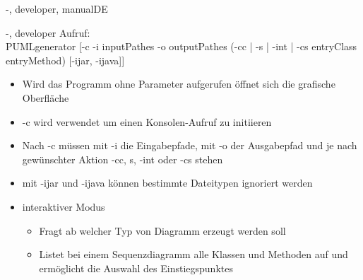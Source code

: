 \documentclass[twoside]{report}
\begin{document}
\begin{shownto}{-, developer, manualDE}



\nsecend


\nsecend


\nsecend


\nsecend




\end{shownto} %
\begin{shownto}{-, developer}
Aufruf:\\
PUMLgenerator [-c -i inputPathes -o outputPathes (-cc | -s | -int | -cs entryClass entryMethod) [-ijar, -ijava]]

\begin{itemize}
\item Wird das Programm ohne Parameter aufgerufen öffnet sich die grafische Oberfläche
\item -c wird verwendet um einen Konsolen-Aufruf zu initiieren
\item  Nach -c müssen mit -i die Eingabepfade, mit -o der Ausgabepfad und je nach gewünschter Aktion -cc, s, -int oder -cs stehen
\item mit -ijar und -ijava können bestimmte Dateitypen ignoriert werden
\item interaktiver Modus
\begin{itemize}
\item Fragt ab welcher Typ von Diagramm erzeugt werden soll
\item Listet bei einem Sequenzdiagramm alle Klassen und Methoden auf und ermöglicht die Auswahl des Einstiegspunktes
\end{itemize}
\end{itemize}


\end{shownto}
\end{document}
